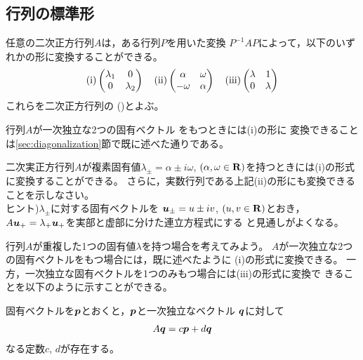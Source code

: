 \documentclass[twocolumn,11pt]{jarticle}
\begin{document}
\subsection{行列の標準形\prog}

任意の二次正方行列$A$は，ある行列$P$を用いた変換
$P^{-1}AP$によって，以下のいずれかの形に変換することができる。
\begin{align}
\mbox{(i)}
  \begin{pmatrix}
    \lambda_1 & 0 \\
    0 &\lambda_2
  \end{pmatrix}
\quad\mbox{(ii)}
  \begin{pmatrix}
    \alpha & \omega \\
    -\omega &\alpha
  \end{pmatrix}
\quad\mbox{(iii)}
  \begin{pmatrix}
    \lambda & 1 \\
    0 &\lambda
  \end{pmatrix}\notag
\end{align}
これらを二次正方行列の
()とよぶ。

行列$A$が一次独立な2つの固有ベクトル
をもつときには(i)の形に
変換できることは\ref{sec:diagonalization}節で既に述べた通りである。

\nquestion
二次実正方行列$A$が複素固有値$\lambda_{\pm}=\alpha\pm i\omega$,
$(\alpha,\omega\in\mathrm{\mathbf{R}})$を持つときには(i)の形式に変換することができる。
さらに，実数行列である上記(ii)の形にも変換できることを示しなさい。\\
ヒント)$\lambda_{\pm}$に対する固有ベクトルを
$\boldsymbol{u}_{\pm}=u\pm iv$, $(u,v\in \mathrm{\mathbf{R}})$とおき，
$A\boldsymbol{u}_+=\lambda_+\boldsymbol{u}_+$を実部と虚部に分けた連立方程式にする
と見通しがよくなる。

\nquestion
行列$A$が重複した1つの固有値$\lambda$を持つ場合を考えてみよう。
$A$が一次独立な2つの固有ベクトルをもつ場合には，既に述べたように
(i)の形式に変換できる。
一方，一次独立な固有ベクトルを1つのみもつ場合には(iii)の形式に変換で
きることを以下のように示すことができる。

固有ベクトルを$\boldsymbol{p}$とおくと，$\boldsymbol{p}$と一次独立なベクトル
$\boldsymbol{q}$に対して
\begin{align}
  \label{eq:toJordan}
  A\boldsymbol{q}=c\boldsymbol{p}+d\boldsymbol{q}
\end{align}
なる定数$c$, $d$が存在する。
\end{document}
